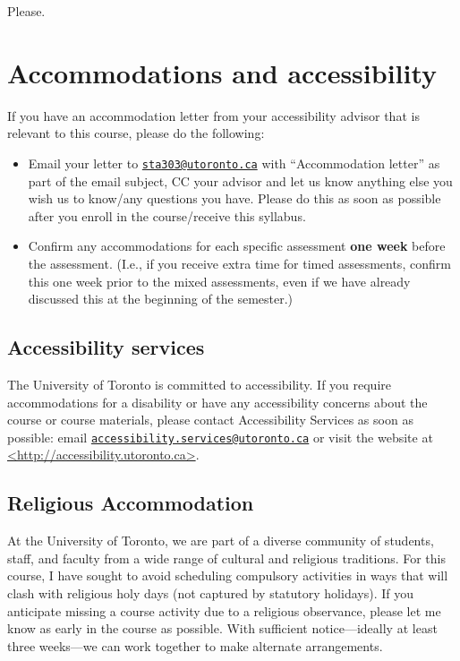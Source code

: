 \documentclass[
  openany]{book}
\begin{document}
Please. 🥺

\hypertarget{accommodations-and-accessibility}{%
\section{Accommodations and accessibility}\label{accommodations-and-accessibility}}

If you have an accommodation letter from your accessibility advisor that is relevant to this course, please do the following:

\begin{itemize}
\item
  Email your letter to \href{mailto:sta303@utoronto.ca}{\nolinkurl{sta303@utoronto.ca}} with ``Accommodation letter'' as part of the email subject, CC your advisor and let us know anything else you wish us to know/any questions you have. Please do this as soon as possible after you enroll in the course/receive this syllabus.
\item
  Confirm any accommodations for each specific assessment \textbf{one week} before the assessment. (I.e., if you receive extra time for timed assessments, confirm this one week prior to the mixed assessments, even if we have already discussed this at the beginning of the semester.)
\end{itemize}

\hypertarget{accessibility-services}{%
\subsection{Accessibility services}\label{accessibility-services}}

The University of Toronto is committed to accessibility. If you require accommodations for a disability or have any accessibility concerns about the course or course materials, please contact Accessibility Services as soon as possible: email \href{mailto:accessibility.services@utoronto.ca}{\nolinkurl{accessibility.services@utoronto.ca}} or visit the website at \href{http://accessibility.utoronto.ca/}{\textless http://accessibility.utoronto.ca\textgreater{}}.

\hypertarget{religious-accommodation}{%
\subsection{Religious Accommodation}\label{religious-accommodation}}

At the University of Toronto, we are part of a diverse community of students, staff, and faculty from a wide range of cultural and religious traditions. For this course, I have sought to avoid scheduling compulsory activities in ways that will clash with religious holy days (not captured by statutory holidays). If you anticipate missing a course activity due to a religious observance, please let me know as early in the course as possible. With sufficient notice---ideally at least three weeks---we can work together to make alternate arrangements.
\end{document}
